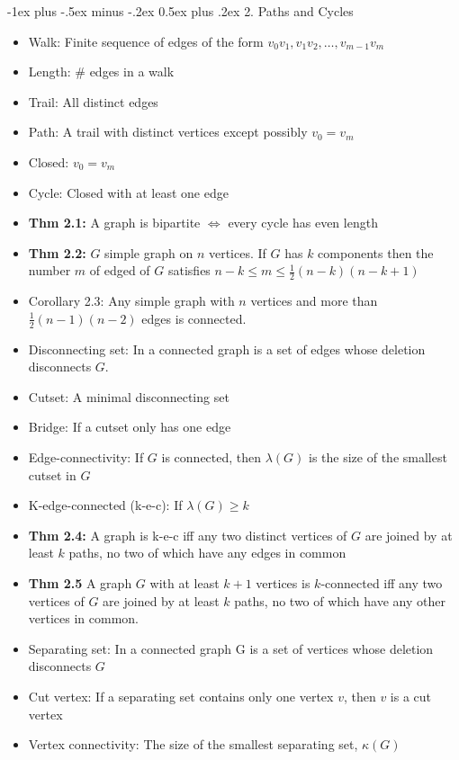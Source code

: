 \documentclass[10pt,landscape]{article}
\makeatletter
\renewcommand{\section}{\@startsection{section}{1}{0mm}%
                                {-1ex plus -.5ex minus -.2ex}%
                                {0.5ex plus .2ex}%
                                {\normalfont\large\bfseries}}
\makeatother
\begin{document}
\begin{multicols}{2}
\section{2. Paths and Cycles}
\begin{itemize}
    \item Walk: Finite sequence of edges of the form $v_0v_1, v_1v_2, \dots, v_{m-1}v_{m}$
    \item Length: \# edges in a walk
    \item Trail: All distinct edges
    \item Path: A trail with distinct vertices except possibly $v_0=v_m$
    \item Closed: $v_0=v_m$
    \item Cycle: Closed with at least one edge
    \item \textbf{Thm 2.1:} A graph is bipartite $\iff$ every cycle has even length
    \item \textbf{Thm 2.2:} $G$ simple graph on $n$ vertices. If $G$ has $k$ components then the number $m$ of edged of $G$ satisfies $n-k\le m\le\frac{1}{2}(n-k)(n-k+1)$
    \item Corollary 2.3: Any simple graph with $n$ vertices and more than $\frac{1}{2}(n-1)(n-2)$ edges is connected.
    \item Disconnecting set: In a connected graph is a set of edges whose deletion disconnects $G$.
    \item Cutset: A minimal disconnecting set
    \item Bridge: If a cutset only has one edge
    \item Edge-connectivity: If $G$ is connected, then $\lambda(G)$ is the size of the smallest cutset in $G$
    \item K-edge-connected (k-e-c): If $\lambda(G)\ge k$
    \item \textbf{Thm 2.4:} A graph is k-e-c iff any two distinct vertices of $G$ are joined by at least $k$ paths, no two of which have any edges in common
    \item \textbf{Thm 2.5} A graph $G$ with at least $k+1$ vertices is $k$-connected iff any two vertices of $G$ are joined by at least $k$ paths, no two of which have any other vertices in common.
    \item Separating set: In a connected graph G is a set of vertices whose deletion disconnects $G$
    \item Cut vertex: If a separating set contains only one vertex $v$, then $v$ is a cut vertex
    \item Vertex connectivity: The size of the smallest separating set, $\kappa(G)$

\end{itemize}
\end{multicols}
\end{document}
